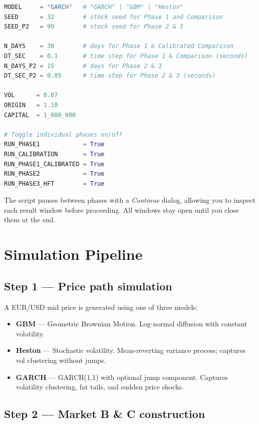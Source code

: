 \documentclass[12pt,a4paper]{article}
\begin{document}
\begin{lstlisting}[language=Python]
MODEL     = "GARCH"   # "GARCH" | "GBM" | "Heston"
SEED      = 32        # stock seed for Phase 1 and Comparison
SEED_P2   = 99        # stock seed for Phase 2 & 3

N_DAYS    = 30        # days for Phase 1 & Calibrated Comparison
DT_SEC    = 0.1       # time step for Phase 1 & Comparison (seconds)
N_DAYS_P2 = 15        # days for Phase 2 & 3
DT_SEC_P2 = 0.05      # time step for Phase 2 & 3 (seconds)

VOL      = 0.07
ORIGIN   = 1.10
CAPITAL  = 1_000_000

# Toggle individual phases on/off
RUN_PHASE1            = True
RUN_CALIBRATION       = True
RUN_PHASE1_CALIBRATED = True
RUN_PHASE2            = True
RUN_PHASE3_HFT        = True
\end{lstlisting}

The script pauses between phases with a \textit{Continue} dialog, allowing you
to inspect each result window before proceeding. All windows stay open until you
close them at the end.

\section{Simulation Pipeline}

\subsection*{Step 1 --- Price path simulation}

A EUR/USD mid price is generated using one of three models:

\begin{itemize}
  \item \textbf{GBM} --- Geometric Brownian Motion. Log-normal diffusion with
        constant volatility.
  \item \textbf{Heston} --- Stochastic volatility. Mean-reverting variance
        process; captures vol clustering without jumps.
  \item \textbf{GARCH} --- GARCH(1,1) with optional jump component. Captures
        volatility clustering, fat tails, and sudden price shocks.
\end{itemize}

\subsection*{Step 2 --- Market B \& C construction}
\end{document}

